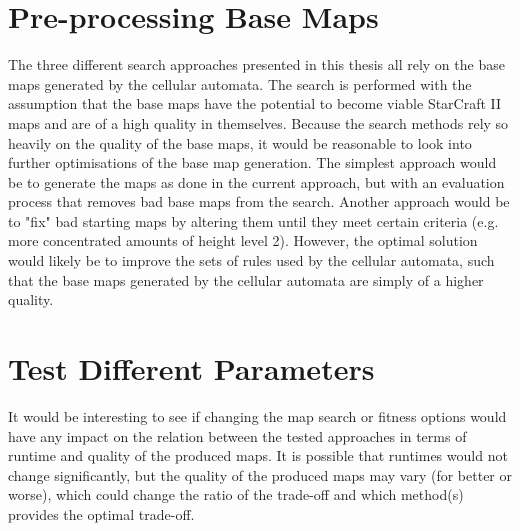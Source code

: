 \section{Pre-processing Base Maps}
\label{futurework_preprocess}
The three different search approaches presented in this thesis all rely on the base maps generated by the cellular automata. The search is performed with the assumption that the base maps have the potential to become viable StarCraft II maps and are of a high quality in themselves. Because the search methods rely so heavily on the quality of the base maps, it would be reasonable to look into further optimisations of the base map generation. The simplest approach would be to generate the maps as done in the current approach, but with an evaluation process that removes bad base maps from the search. Another approach would be to "fix" bad starting maps by altering them until they meet certain criteria (e.g. more concentrated amounts of height level 2). However, the optimal solution would likely be to improve the sets of rules used by the cellular automata, such that the base maps generated by the cellular automata are simply of a higher quality.

\section{Test Different Parameters}
\label{futurework_differentparameters}
It would be interesting to see if changing the map search or fitness options would have any impact on the relation between the tested approaches in terms of runtime and quality of the produced maps. It is possible that runtimes would not change significantly, but the quality of the produced maps may vary (for better or worse), which could change the ratio of the trade-off and which method(s) provides the optimal trade-off.